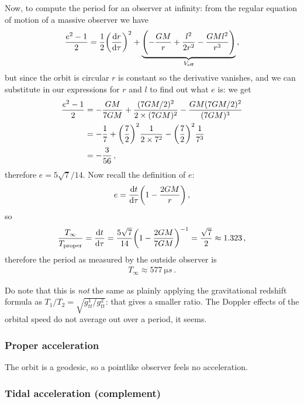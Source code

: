 \documentclass[main.tex]{subfiles}
\begin{document}
Now, to compute the period for an observer at infinity: from the regular equation of motion of a massive observer we have 
%
\begin{align}
  \frac{e^2-1}{2} = \frac{1}{2} \qty(\dv{r}{\tau })^2+ \underbrace{\qty(-\frac{GM}{r} + \frac{l^2}{2r^2} - \frac{GMl^2}{r^3})}_{V _{\text{eff}}}
\,,
\end{align}
%
but since the orbit is circular \(r\) is constant so the derivative vanishes, and we can substitute in our expressions for \(r\) and \(l\) to find out what \(e\) is: we get 
%
\begin{align}
  \frac{e^2-1}{2} &= - \frac{GM}{7GM} + \frac{(7GM/2)^2}{2\times (7GM)^2} - \frac{GM (7GM/2)^2}{(7GM)^3}  \\
&= - \frac{1}{7}+ \qty(\frac{7}{2})^2 \frac{1}{2\times 7^2} - \qty(\frac{7}{2})^2 \frac{1}{7^3}  \\
&= -\frac{3}{56}
\,,
\end{align}
%
therefore \(e = 5 \sqrt{7} / 14\). Now recall the definition of \(e\): 
%
\begin{align}
  e = \dv{t}{\tau } \qty(1 - \frac{2GM}{r}) 
\,,
\end{align}
%
so 
%
\begin{align}
  \frac{T_{ \infty }}{T _{\text{proper}}} = 
  \dv{t}{\tau } = \frac{5 \sqrt{7}}{14} \qty(1 - \frac{2GM}{7GM})^{-1} = \frac{\sqrt{7}}{2} \approx 1.323 
\,,
\end{align}
%
therefore the period as measured by the outside observer is 
%
\begin{align}
  T_{ \infty } \approx \SI{577}{\micro s}
\,.
\end{align}
%

Do note that this is \emph{not} the same as plainly applying the gravitational redshift formula as \(T_1 / T_2 = \sqrt{ g_{tt}^{1}/ g_{tt}^{2}}\): that gives a smaller ratio. The Doppler effects of the orbital speed do not average out over a period, it seems. 

\subsubsection{Proper acceleration}

The orbit is a geodesic, so a pointlike observer feels no acceleration. 

\subsubsection{Tidal acceleration (complement)}
\end{document}
